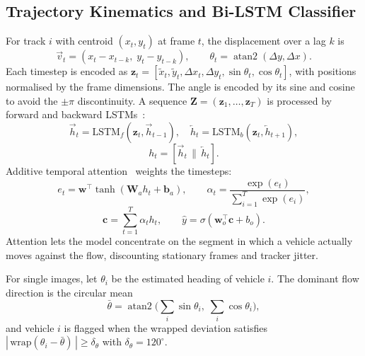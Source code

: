 \documentclass[conference]{IEEEtran}
\begin{document}
\subsection{Trajectory Kinematics and Bi-LSTM Classifier}
For track $i$ with centroid $(x_t, y_t)$ at frame $t$, the displacement over a lag $k$ is
\begin{equation}
\vec{v}_t = (x_t - x_{t-k},\; y_t - y_{t-k}), \qquad \theta_t = \operatorname{atan2}(\Delta y, \Delta x).
\end{equation}
Each timestep is encoded as $\mathbf{z}_t = [\tilde{x}_t, \tilde{y}_t, \Delta x_t, \Delta y_t, \sin\theta_t, \cos\theta_t]$, with positions normalised by the frame dimensions. The angle is encoded by its sine and cosine to avoid the $\pm\pi$ discontinuity. A sequence $\mathbf{Z} = (\mathbf{z}_1,\dots,\mathbf{z}_T)$ is processed by forward and backward LSTMs~\cite{hochreiter1997lstm,graves2005bilstm}:
\begin{equation}
\overrightarrow{h}_t = \mathrm{LSTM}_f(\mathbf{z}_t, \overrightarrow{h}_{t-1}), \quad
\overleftarrow{h}_t = \mathrm{LSTM}_b(\mathbf{z}_t, \overleftarrow{h}_{t+1}),
\end{equation}
\begin{equation}
h_t = [\overrightarrow{h}_t \,\|\, \overleftarrow{h}_t].
\end{equation}
Additive temporal attention~\cite{bahdanau2015attention} weights the timesteps:
\begin{equation}
e_t = \mathbf{w}^{\top}\tanh(\mathbf{W}_a h_t + \mathbf{b}_a), \qquad
\alpha_t = \frac{\exp(e_t)}{\sum_{i=1}^{T}\exp(e_i)},
\end{equation}
\begin{equation}
\mathbf{c} = \sum_{t=1}^{T}\alpha_t h_t, \qquad
\hat{y} = \sigma(\mathbf{w}_o^{\top}\mathbf{c} + b_o).
\end{equation}
Attention lets the model concentrate on the segment in which a vehicle actually moves against the flow, discounting stationary frames and tracker jitter.

For single images, let $\theta_i$ be the estimated heading of vehicle $i$. The dominant flow direction is the circular mean
\begin{equation}
\bar{\theta} = \operatorname{atan2}\Big(\textstyle\sum_i \sin\theta_i,\; \sum_i \cos\theta_i\Big),
\end{equation}
and vehicle $i$ is flagged when the wrapped deviation satisfies $|\,\mathrm{wrap}(\theta_i - \bar{\theta})\,| \geq \delta_{\theta}$ with $\delta_{\theta} = 120^{\circ}$.
\end{document}
